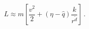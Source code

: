 \begin{equation} \label{ApproxL}
    L \approx m \left[ \frac{v^2}{2} + (\eta - \hat{q})
    \frac{k}{r^{\tilde{d}}} \right] \, .
\end{equation}

